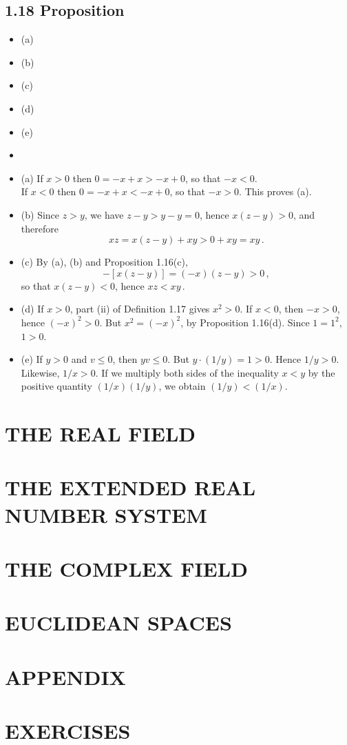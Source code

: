 \subsection*{1.18 Proposition}
\begin{itemize}
\item[] (a) 
\item[] (b)  
\item[] (c) 
\item[] (d) 
\item[] (e) 
\item[]  
\item[] (a) If $x > 0$ then $0 = -x + x > -x + 0$, so that $-x < 0$.\\
If $x < 0$ then $0 = -x + x < -x + 0$, so that $-x > 0$. This proves (a).   
\item[] (b) Since $z > y$, we have $z - y > y - y = 0$, hence $x(z - y) > 0$, and therefore 
$$xz = x (z - y) + xy > 0 + xy = xy\,.$$   
\item[] (c) By (a), (b) and Proposition 1.16(c),
$$-[x(z - y)] = (-x)(z - y) > 0\,,$$ so that $x(z - y) < 0$, hence $xz < xy\,.$  
\item[] (d) If $x > 0$, part (ii) of Definition 1.17 gives $x^2 > 0$. If $x < 0$, then $-x > 0$, hence $(-x)^2 > 0$. 
But $x^2 = (-x)^2$, by Proposition 1.16(d). Since $1 = 1^2$, $1 > 0$.     
\item[] (e) If $y > 0$ and $v \leq 0$, then $yv \leq 0$. But $y \cdot (1/y) =1 > 0$. Hence $1/y > 0$. 
Likewise, $1/x > 0$. If we multiply both sides of the inequality $x < y$ by the positive quantity 
$(1/x)(1/y)$, we obtain $(1/y) < (1/x)$.     
\end{itemize}



\section*{THE REAL FIELD}


\section*{THE EXTENDED REAL NUMBER SYSTEM}


\section*{THE COMPLEX FIELD}


\section*{EUCLIDEAN SPACES}


\section*{APPENDIX}


\section*{EXERCISES}





